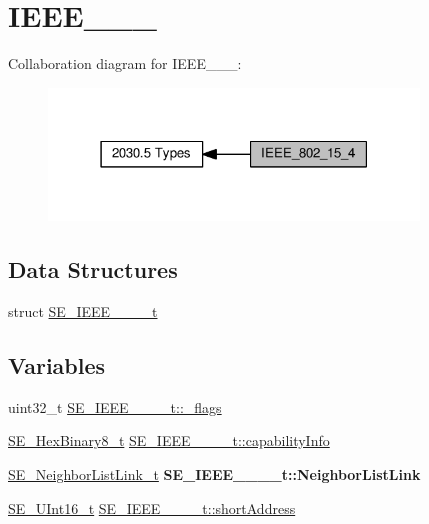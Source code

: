 \hypertarget{group__IEEE__802__15__4}{}\section{I\+E\+E\+E\+\_\+\_\+\_}
\label{group__IEEE__802__15__4}
Collaboration diagram for I\+E\+E\+E\+\_\+\_\+\_\+:\nopagebreak
\begin{figure}[H]
\begin{center}
\leavevmode
\includegraphics[width=279pt]{group__IEEE__802__15__4}
\end{center}
\end{figure}
\subsection*{Data Structures}
\begin{DoxyCompactItemize}
\item 
struct \hyperlink{structSE__IEEE__802__15__4__t}{S\+E\+\_\+\+I\+E\+E\+E\+\_\+\_\+\_\+\_\+t}
\end{DoxyCompactItemize}
\subsection*{Variables}
\begin{DoxyCompactItemize}
\item 
uint32\+\_\+t \hyperlink{group__IEEE__802__15__4_ga70921a1684123e1205ce217e660f59a1}{S\+E\+\_\+\+I\+E\+E\+E\+\_\+\_\+\_\+\_\+t\+::\+\_\+flags}
\item 
\hyperlink{group__HexBinary8_gaecf2dab3615fb954a693c017a61f77d6}{S\+E\+\_\+\+Hex\+Binary8\+\_\+t} \hyperlink{group__IEEE__802__15__4_ga1a4b7766899d73e6a3202c95eb813123}{S\+E\+\_\+\+I\+E\+E\+E\+\_\+\_\+\_\+\_\+t\+::capability\+Info}
\item 
\mbox{\label{group__IEEE__802__15__4_ga0455719bc92fe64270ba54cce641a879}} 
\hyperlink{structSE__NeighborListLink__t}{S\+E\+\_\+\+Neighbor\+List\+Link\+\_\+t} {\bfseries S\+E\+\_\+\+I\+E\+E\+E\+\_\+\_\+\_\+\_\+t\+::\+Neighbor\+List\+Link}
\item 
\hyperlink{group__UInt16_gac68d541f189538bfd30cfaa712d20d29}{S\+E\+\_\+\+U\+Int16\+\_\+t} \hyperlink{group__IEEE__802__15__4_gab2e418772d2677aa0c54140a3f460947}{S\+E\+\_\+\+I\+E\+E\+E\+\_\+\_\+\_\+\_\+t\+::short\+Address}
\end{DoxyCompactItemize}


